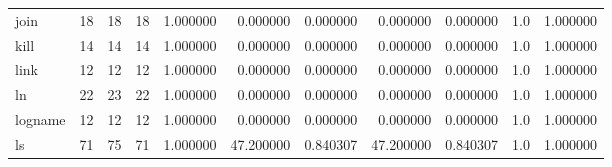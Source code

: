 \begin{longtable}{lrrrrrrrrrr}
join      &                                      18 &                 18 &                                18 &                                   1.000000 &                               0.000000 &                                     0.000000 &                          0.000000 &                                0.000000 &                                1.0 &                                           1.000000 \\
kill      &                                      14 &                 14 &                                14 &                                   1.000000 &                               0.000000 &                                     0.000000 &                          0.000000 &                                0.000000 &                                1.0 &                                           1.000000 \\
link      &                                      12 &                 12 &                                12 &                                   1.000000 &                               0.000000 &                                     0.000000 &                          0.000000 &                                0.000000 &                                1.0 &                                           1.000000 \\
ln        &                                      22 &                 23 &                                22 &                                   1.000000 &                               0.000000 &                                     0.000000 &                          0.000000 &                                0.000000 &                                1.0 &                                           1.000000 \\
logname   &                                      12 &                 12 &                                12 &                                   1.000000 &                               0.000000 &                                     0.000000 &                          0.000000 &                                0.000000 &                                1.0 &                                           1.000000 \\
ls        &                                      71 &                 75 &                                71 &                                   1.000000 &                              47.200000 &                                     0.840307 &                         47.200000 &                                0.840307 &                                1.0 &                                           1.000000 \\

\end{longtable}
